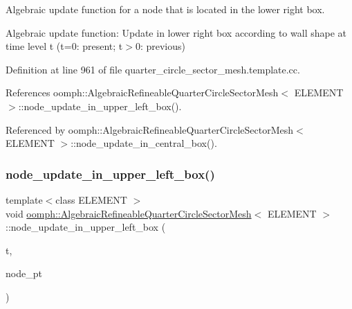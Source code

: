 Algebraic update function for a node that is located in the lower right box. 

Algebraic update function\+: Update in lower right box according to wall shape at time level t (t=0\+: present; t$>$0\+: previous) 

Definition at line 961 of file quarter\+\_\+circle\+\_\+sector\+\_\+mesh.\+template.\+cc.



References oomph\+::\+Algebraic\+Refineable\+Quarter\+Circle\+Sector\+Mesh$<$ E\+L\+E\+M\+E\+N\+T $>$\+::node\+\_\+update\+\_\+in\+\_\+upper\+\_\+left\+\_\+box().



Referenced by oomph\+::\+Algebraic\+Refineable\+Quarter\+Circle\+Sector\+Mesh$<$ E\+L\+E\+M\+E\+N\+T $>$\+::node\+\_\+update\+\_\+in\+\_\+central\+\_\+box().

\mbox{\label{classoomph_1_1AlgebraicRefineableQuarterCircleSectorMesh_aeb36f6747d14cd68d4857169fa0f22d1}} 
\subsubsection{\texorpdfstring{node\+\_\+update\+\_\+in\+\_\+upper\+\_\+left\+\_\+box()}{node\_update\_in\_upper\_left\_box()}}
{\footnotesize\ttfamily template$<$class E\+L\+E\+M\+E\+NT $>$ \\
void \hyperlink{classoomph_1_1AlgebraicRefineableQuarterCircleSectorMesh}{oomph\+::\+Algebraic\+Refineable\+Quarter\+Circle\+Sector\+Mesh}$<$ E\+L\+E\+M\+E\+NT $>$\+::node\+\_\+update\+\_\+in\+\_\+upper\+\_\+left\+\_\+box (\begin{DoxyParamCaption}\item[{const unsigned \&}]{t,  }\item[{Algebraic\+Node $\ast$\&}]{node\+\_\+pt }\end{DoxyParamCaption})\hspace{0.3cm}{\ttfamily [private]}}



